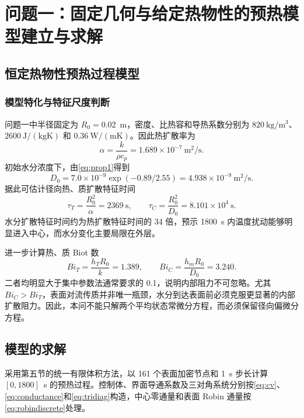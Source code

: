 \section{问题一：固定几何与给定热物性的预热模型建立与求解}

\subsection{恒定热物性预热过程模型}

\subsubsection{模型特化与特征尺度判断}

问题一中半径固定为 $R_0=0.02$~m，密度、比热容和导热系数分别为 $820~\mathrm{kg/m^3}$、$2600~\mathrm{J/(kgK)}$ 和 $0.36~\mathrm{W/(mK)}$。因此热扩散率为
\begin{equation}
\alpha=\frac{k}{\rho c_p}=1.689\times10^{-7}~\mathrm{m^2/s}.
\label{eq:alpha1}
\end{equation}
初始水分浓度下，由\cref{eq:prop1}得到
\begin{equation}
D_0=7.0\times10^{-9}\exp(-0.89/2.55)
=4.938\times10^{-9}~\mathrm{m^2/s}.
\label{eq:d01}
\end{equation}
据此可估计径向热、质扩散特征时间
\begin{equation}
\tau_T=\frac{R_0^2}{\alpha}=2369~\mathrm{s},\qquad
\tau_C=\frac{R_0^2}{D_0}=8.101\times10^4~\mathrm{s}.
\label{eq:timescale1}
\end{equation}
水分扩散特征时间约为热扩散特征时间的 34 倍，预示 1800~s 内温度扰动能够明显进入中心，而水分变化主要局限在外层。

进一步计算热、质 Biot 数
\begin{equation}
Bi_T=\frac{h_TR_0}{k}=1.389,\qquad
Bi_C=\frac{h_mR_0}{D_0}=3.240.
\label{eq:bi1}
\end{equation}
二者均明显大于集中参数法通常要求的 0.1，说明内部阻力不可忽略。尤其 $Bi_C>Bi_T$，表面对流传质并非唯一瓶颈，水分到达表面前必须克服更显著的内部扩散阻力。因此，本问不能只解两个平均状态常微分方程，而必须保留径向偏微分方程。

\subsection{模型的求解}

采用第五节的统一有限体积方法，以 161 个表面加密节点和 1~s 步长计算 $[0,1800]$~s 的预热过程。控制体、界面导通系数及三对角系统分别按\cref{eq:cv}、\cref{eq:conductance}和\cref{eq:tridiag}构造，中心零通量和表面 Robin 通量按\cref{eq:robindiscrete}处理。

